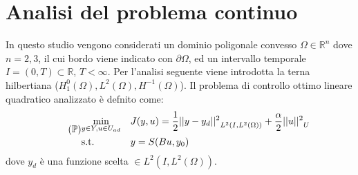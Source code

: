 \chapter{Analisi del problema continuo}
\label{chap:Continuos}

In questo studio vengono considerati un dominio poligonale convesso $\Omega \in \mathbb{R}^n$ dove $n=2,3$, il cui bordo viene indicato con $\partial\Omega$, ed un intervallo temporale $I = (0,T) \subset \mathbb{R}$, $T < \infty$. 
Per l'analisi seguente viene introdotta la terna hilbertiana (${H^{0}_{1}(\Omega)},{L^{2}(\Omega)},{H^{-1}(\Omega)}$).
Il problema di controllo ottimo lineare quadratico analizzato è defnito come:
{\renewcommand\arraystretch{2}
\begin{equation}
\tag{$\mathbb{P}$}
\begin{aligned}
& \underset{y \in Y, u \in U_{ad}}{\text{min}}
& & J(y,u) = \frac{1}{2}{||y-y_d||^{2}}_{L^2(I,{L^{2}(\Omega)})} + \frac{\alpha}{2}{||u||^{2}}_U \\
& \text{s.t.} & & y = S(Bu,y_0) \\
\label{eq:200}
\end{aligned}
\end{equation}
} %
dove $y_d$ è una funzione scelta $\in L^2(I,{L^{2}(\Omega)})$.

